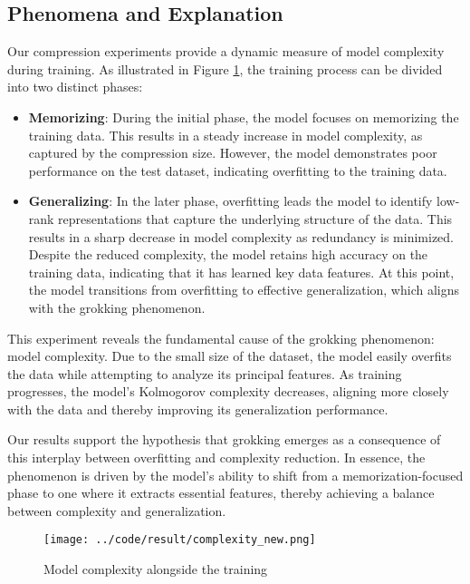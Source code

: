 \documentclass{article}
\begin{document}
\subsection{Phenomena and Explanation}

Our compression experiments provide a dynamic measure of model complexity during training. As illustrated in Figure \ref{fig:complexity}, the training process can be divided into two distinct phases:  

\begin{itemize}
    \item \textbf{Memorizing}: During the initial phase, the model focuses on memorizing the training data. This results in a steady increase in model complexity, as captured by the compression size. However, the model demonstrates poor performance on the test dataset, indicating overfitting to the training data.  
    \item \textbf{Generalizing}: In the later phase, overfitting leads the model to identify low-rank representations that capture the underlying structure of the data. This results in a sharp decrease in model complexity as redundancy is minimized. Despite the reduced complexity, the model retains high accuracy on the training data, indicating that it has learned key data features. At this point, the model transitions from overfitting to effective generalization, which aligns with the grokking phenomenon.
\end{itemize}  

This experiment reveals the fundamental cause of the grokking phenomenon: model complexity. Due to the small size of the dataset, the model easily overfits the data while attempting to analyze its principal features. As training progresses, the model's Kolmogorov complexity decreases, aligning more closely with the data and thereby improving its generalization performance.

Our results support the hypothesis that grokking emerges as a consequence of this interplay between overfitting and complexity reduction. In essence, the phenomenon is driven by the model's ability to shift from a memorization-focused phase to one where it extracts essential features, thereby achieving a balance between complexity and generalization.

\begin{figure}[ht]
    \centering
    \texttt{[image: ../code/result/complexity\_new.png]}
    \caption{Model complexity alongside the training}
    \label{fig:complexity}
\end{figure}
\end{document}
